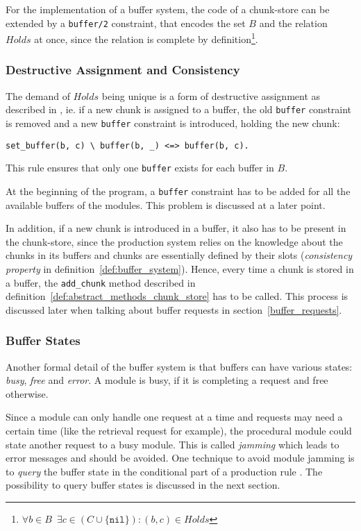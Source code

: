 For the implementation of a buffer system, the code of a chunk-store can be extended by a \verb|buffer/2| constraint, that encodes the set $B$ and the relation $Holds$ at once, since the relation is complete by definition\footnote{$\forall b \in B \enspace \exists c \in (C \cup \{ \mathtt{nil} \}): (b,c) \in Holds$}.

\subsubsection{Destructive Assignment and Consistency}
\label{destructive_assignment}

The demand of $Holds$ being unique is a form of destructive assignment as described in \cite[p. 32]{fru_chr_book_2009}, ie. if a new chunk is assigned to a buffer, the old \verb|buffer| constraint is removed and a new \verb|buffer| constraint is introduced, holding the new chunk:

\begin{lstlisting}
set_buffer(b, c) \ buffer(b, _) <=> buffer(b, c).
\end{lstlisting}

This rule ensures that only one \verb|buffer| exists for each buffer in $B$.

At the beginning of the program, a \verb|buffer| constraint has to be added for all the available buffers of the modules. This problem is discussed at a later point. 

In addition, if a new chunk is introduced in a buffer, it also has to be present in the chunk-store, since the production system relies on the knowledge about the chunks in its buffers and chunks are essentially defined by their slots (\emph{consistency property} in definition~\ref{def:buffer_system}). Hence, every time a chunk is stored in a buffer, the \verb|add_chunk| method described in definition~\ref{def:abstract_methods_chunk_store} has to be called. This process is discussed later when talking about buffer requests in section~\ref{buffer_requests}.

\subsubsection{Buffer States}

Another formal detail of the buffer system is that buffers can have various states: \emph{busy}, \emph{free} and \emph{error}. A module is busy, if it is completing a request and free otherwise.

Since a module can only handle one request at a time and requests may need a certain time (like the retrieval request for example), the procedural module could state another request to a busy module. This is called \emph{jamming} which leads to error messages and should be avoided. One technique to avoid module jamming is to \emph{query} the buffer state in the conditional part of a production rule \cite[unit 2, p. 9]{actr_tutorial}. The possibility to query buffer states is discussed in the next section.

